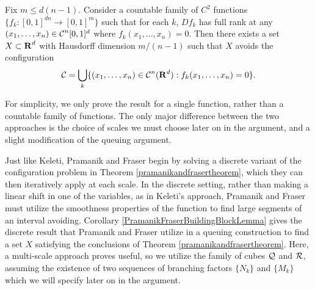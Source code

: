\begin{theorem} \label{pramanikandfrasertheorem}
    Fix $m \leq d(n-1)$. Consider a countable family of $C^2$ functions $\{ f_k : [0,1]^{dn} \to [0,1]^m \}$ such that for each $k$, $Df_k$ has full rank at any $(x_1, \dots, x_n) \in \operatorname{\mathcal{C}}^n[0,1]^d$ where $f_k(x_1, \dots, x_n) = 0$. Then there exists a set $X \subset \operatorname{\mathbf{R}}^d$ with Hausdorff dimension $m/(n-1)$ such that $X$ avoids the configuration
    \[ \operatorname{\mathcal{C}} = \bigcup_k \{ (x_1, \dots, x_n) \in \operatorname{\mathcal{C}}^n(\operatorname{\mathbf{R}}^d): f_k(x_1, \dots, x_n) = 0 \}. \]
\end{theorem}

\begin{remark}
    For simplicity, we only prove the result for a single function, rather than a countable family of functions. The only major difference between the two approaches is the choice of scales we must choose later on in the argument, and a slight modification of the queuing argument.
\end{remark}

Just like Keleti, Pramanik and Fraser begin by solving a discrete variant of the configuration problem in Theorem \ref{pramanikandfrasertheorem}, which they can then iteratively apply at each scale. In the discrete setting, rather than making a linear shift in one of the variables, as in Keleti's approach, Pramanik and Fraser must utilize the smoothness properties of the function to find large segments of an interval avoiding. Corollary \ref{PramanikFraserBuildingBlockLemma} gives the discrete result that Pramanik and Fraser utilize in a queuing construction to find a set $X$ satisfying the conclusions of Theorem \ref{pramanikandfrasertheorem}. Here, a multi-scale approach proves useful, so we utilize the family of cubes $\operatorname{\mathcal{Q}}$ and $\operatorname{\mathcal{R}}$, assuming the existence of two sequences of branching factors $\{ N_k \}$ and $\{ M_k \}$ which we will specify later on in the argument.

